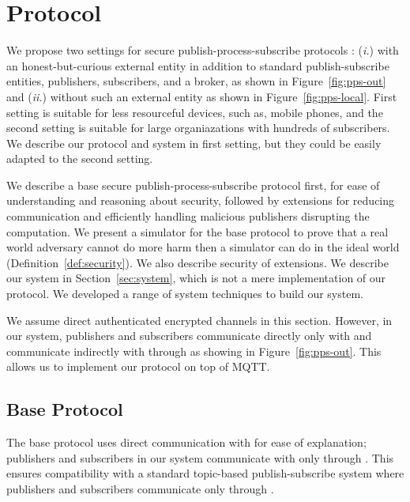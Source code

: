 \section{Protocol}
\label{sec:protocol}

We propose two settings for secure publish-process-subscribe protocols :
(\emph{i.}) with an honest-but-curious external entity in addition to standard
publish-subscribe entities, publishers, subscribers, and a broker, as shown in
Figure~\ref{fig:pps-out} and (\emph{ii.}) without such an external entity as
shown in Figure~\ref{fig:pps-local}. First setting is suitable for less
resourceful devices, such as, mobile phones, and the second setting is suitable
for large organiazations with hundreds of subscribers. We describe our protocol
and system in first setting, but they could be easily adapted to the second
setting.



We describe a base secure publish-process-subscribe protocol first, for ease of
understanding and reasoning about security, followed by extensions for reducing
communication and efficiently handling malicious publishers disrupting the
computation.  We present a simulator for the base protocol to prove that a real
world adversary cannot do more harm then a simulator can do in the ideal world
(Definition~\ref{def:security}). We also describe security of extensions. We
describe our system in Section~\ref{sec:system}, which is not a mere
implementation of our protocol. We developed a range of system techniques to
build our system.

We assume direct authenticated encrypted channels in this section.  However, in
our system, publishers and subscribers communicate directly only with \broker
and communicate indirectly with \garbler through \broker as showing in
Figure~\ref{fig:pps-out}. This allows us to implement our protocol on top of
MQTT.

\subsection{Base Protocol}


The base protocol uses direct communication with \garbler for ease of
explanation; publishers and subscribers in our system communicate with \garbler
only through \broker. This ensures compatibility with a standard topic-based
publish-subscribe system where publishers and subscribers communicate only
through \broker.

